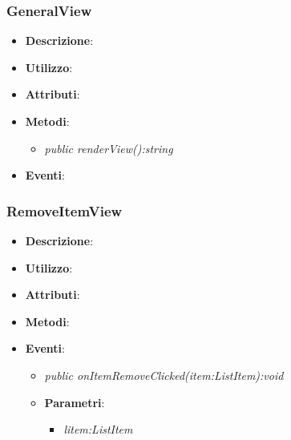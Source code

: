 \subsubsection{GeneralView}
\begin{itemize}
\item \textbf{Descrizione}: 
\item \textbf{Utilizzo}:
\item \textbf{Attributi}: 
\item \textbf{Metodi}:
	\begin{itemize}
	\item \textit{public renderView():string}\\

	\end{itemize}
\item \textbf{Eventi}:
\end{itemize}

\subsubsection{RemoveItemView}
\begin{itemize}
\item \textbf{Descrizione}: 
\item \textbf{Utilizzo}:
\item \textbf{Attributi}: 
\item \textbf{Metodi}:
\item \textbf{Eventi}:
	\begin{itemize}	
	\item \textit{public onItemRemoveClicked(item:ListItem):void}\\

			\item{\textbf{Parametri}: \begin{itemize}
			\item \textit{litem:ListItem}\\

			\end{itemize}}
	\end{itemize}
\end{itemize}

